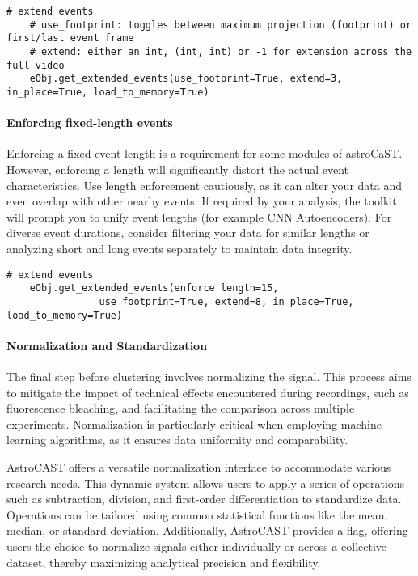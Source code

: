 \begin{lstlisting}[style=pyStyle]
    # extend events
    # use_footprint: toggles between maximum projection (footprint) or first/last event frame
    # extend: either an int, (int, int) or -1 for extension across the full video
    eObj.get_extended_events(use_footprint=True, extend=3, in_place=True, load_to_memory=True)
\end{lstlisting}

\paragraph{Enforcing fixed-length events}
\label{par:enforcing-length}
Enforcing a fixed event length is a requirement for some modules of astroCaST. However, enforcing a length will significantly distort the actual event characteristics. Use length enforcement cautiously, as it can alter your data and even overlap with other nearby events. If required by your analysis, the toolkit will prompt you to unify event lengths (for example \ac{CNN} Autoencoders). For diverse event durations, consider filtering your data for similar lengths or analyzing short and long events separately to maintain data integrity.

\begin{lstlisting}[style=pyStyle]
    # extend events
    eObj.get_extended_events(enforce length=15,
                use_footprint=True, extend=8, in_place=True, load_to_memory=True)
\end{lstlisting}

\paragraph{Normalization and Standardization}
The final step before clustering involves normalizing the signal. This process aims to mitigate the impact of technical effects encountered during recordings, such as fluorescence bleaching, and facilitating the comparison across multiple experiments. Normalization is particularly critical when employing machine learning algorithms, as it ensures data uniformity and comparability.

AstroCAST offers a versatile normalization interface to accommodate various research needs. This dynamic system allows users to apply a series of operations such as subtraction, division, and first-order differentiation to standardize data. Operations can be tailored using common statistical functions like the mean, median, or standard deviation. Additionally, AstroCAST provides a  flag, offering users the choice to normalize signals either individually or across a collective dataset, thereby maximizing analytical precision and flexibility.

